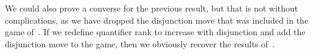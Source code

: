 \documentclass[10pt,a4paper]{amsart}
\newtheorem{proposition}[definition]{Proposition}
\newcommand{\wins}{\mathbin{\raisebox{0.8\depth}{$\uparrow$}}}
\newcommand{\playertwo}{\mathrm{\mathbf{II}}}
\DeclareMathOperator{\EF}{EF}
\newcommand{\A}{\mathfrak{A}}
\newcommand{\B}{\mathfrak{B}}
\newcommand\ivee{\mathrel{\rotatebox[origin=c]{270}{$\geqslant$}}}
\newcommand{\posEquiv}{\mathbin{\Rrightarrow}}
\newcommand{\deplog}{\mathcal D}
\begin{document}
We could also prove a converse for the previous result, but that is not without complications, as we have dropped the disjunction move that was included in the game of~\cite{MR2351449}. If we redefine quantifier rank to increase with disjunction and add the disjunction move to the game, then we obviously recover the results of~\cite{MR2351449}.



\end{document}
